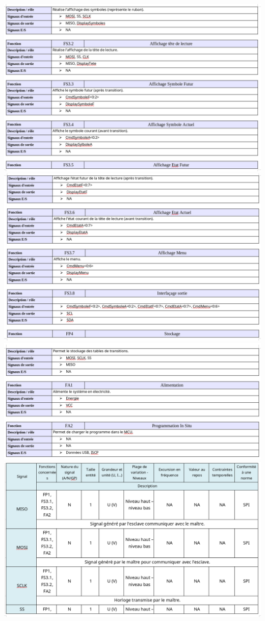 \documentclass[12pt]{report}
\begin{document}
	\includegraphics[width=\textwidth]{img/f3}
	\includegraphics[width=\textwidth]{img/f4}
	\includegraphics[width=\textwidth]{img/f5}
	\includegraphics[width=\textwidth]{img/s1}
\end{document}

